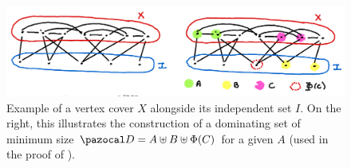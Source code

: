 \begin{figure}
    \includegraphics[width=\textwidth]{figures/domset-vc.png}
    \caption{Example of a vertex cover $X$ alongside its independent set $I$. On the right, this illustrates the construction of a dominating set of minimum size $\D = A \uplus B \uplus \Phi(C)$ for a given $A$ (used in the proof of ).}
    \label{fig:domset-vc}
\end{figure}